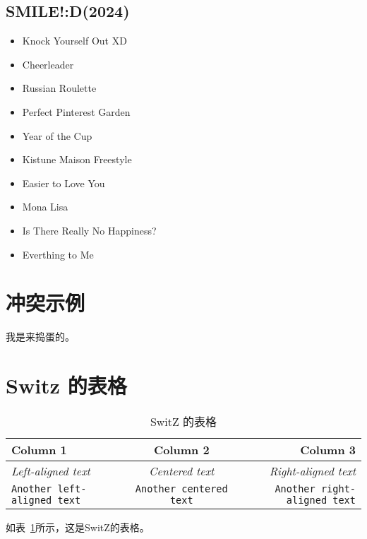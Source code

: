 \documentclass{article}
\begin{document}
\subsection{SMILE!:D(2024)}

\begin{itemize}
    \item Knock Yourself Out XD
    \item Cheerleader
    \item Russian Roulette
    \item Perfect Pinterest Garden
    \item Year of the Cup
    \item Kistune Maison Freestyle
    \item Easier to Love You
    \item Mona Lisa
    \item Is There Really No Happiness?
    \item Everthing to Me
\end{itemize}

\section{冲突示例}

我是来捣蛋的。

\section{ Switz 的表格}

\begin{table}[h]
    \centering
    \begin{tabular}{lcr}
        \toprule
        \textbf{Column 1}                  & \textbf{Column 2}              & \textbf{Column 3}                   \\
        \midrule
        \textit{Left-aligned text}         & \textit{Centered text}         & \textit{Right-aligned text}         \\
        \texttt{Another left-aligned text} & \texttt{Another centered text} & \texttt{Another right-aligned text} \\
        \bottomrule
    \end{tabular}
    \caption{SwitZ 的表格}
    \label{tab:switz}
\end{table}

如表~\ref{tab:switz}所示，这是SwitZ的表格。
\end{document}
